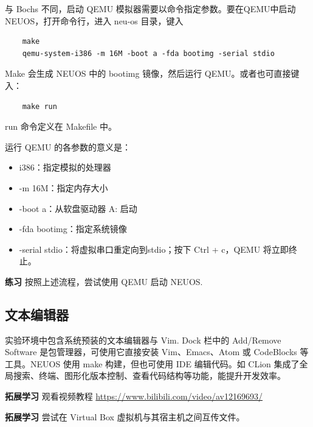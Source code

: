 与 Bochs 不同，启动 QEMU 模拟器需要以命令指定参数。要在QEMU中启动 NEUOS，打开命令行，进入 neu-os 目录，键入

\begin{lstlisting}
    make
    qemu-system-i386 -m 16M -boot a -fda bootimg -serial stdio
\end{lstlisting}

Make 会生成 NEUOS 中的 bootimg 镜像，然后运行 QEMU。或者也可直接键入：

\begin{lstlisting}
    make run
\end{lstlisting}

run 命令定义在 Makefile 中。

运行 QEMU 的各参数的意义是：

\begin{itemize}
    \item i386：指定模拟的处理器
    \item -m 16M：指定内存大小
    \item -boot a：从软盘驱动器 A: 启动
    \item -fda bootimg：指定系统镜像
    \item -serial stdio：将虚拟串口重定向到stdio；按下 Ctrl + c，QEMU 将立即终止。
\end{itemize}

\begin{mdframed}[hidealllines=true,backgroundcolor=gray!20]
\textbf{练习 } 按照上述流程，尝试使用 QEMU 启动 NEUOS.
\end{mdframed}

\subsection{文本编辑器}

实验环境中包含系统预装的文本编辑器与 Vim. Dock 栏中的 Add/Remove Software 是包管理器，可使用它直接安装 Vim、Emacs、Atom 或 CodeBlocks 等工具。NEUOS 使用 make 构建，但也可使用 IDE 编辑代码。如 CLion 集成了全局搜索、终端、图形化版本控制、查看代码结构等功能，能提升开发效率。

\begin{mdframed}[hidealllines=true,backgroundcolor=gray!20]
\textbf{拓展学习 }观看视频教程 \url{https://www.bilibili.com/video/av12169693/}
\end{mdframed}

\begin{mdframed}[hidealllines=true,backgroundcolor=gray!20]
\textbf{拓展学习 }尝试在 Virtual Box 虚拟机与其宿主机之间互传文件。
\end{mdframed}